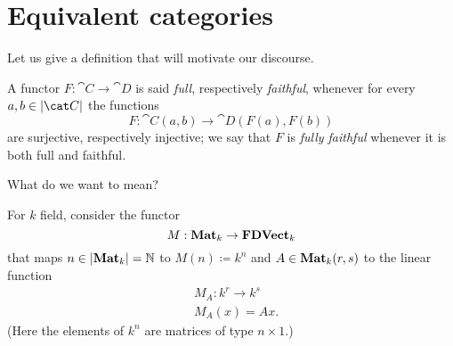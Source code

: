 
\section{Equivalent categories}

Let us give a definition that will motivate our discourse.

\begin{definition}
  A functor \(F : \cat C \to \cat D\) is said {\em full}, respectively
  {\em faithful}, whenever for every \(a, b \in \obj{\cat C}\) the
  functions
  \[F : \cat C (a, b) \to \cat D(F(a), F(b))\] are surjective,
  respectively injective; we say that \(F\) is {\em fully faithful}
   whenever it is both full and
  faithful.
\end{definition}

What do we want  to mean?

\begin{example}\label{example:MatrixFunctor}
  For \(k\) field, consider the functor
  \[M : \mathbf{Mat}_k \to \mathbf{FDVect}_k\] that maps
  \(n \in \left\lvert\mathbf{Mat}_k\right\rvert = \mathbb N\) to \(M(n) \coloneq k^n\) and
  \(A \in \mathbf{Mat}_k(r, s)\) to the linear function
  \[\begin{aligned}
    & M_A : k^r \to k^s \\
    & M_A(x) = Ax .
  \end{aligned}\]
(Here the elements of \(k^n\) are matrices of type \(n \times 1\).) \NotaInterna{\dots{}} %
\end{example}


